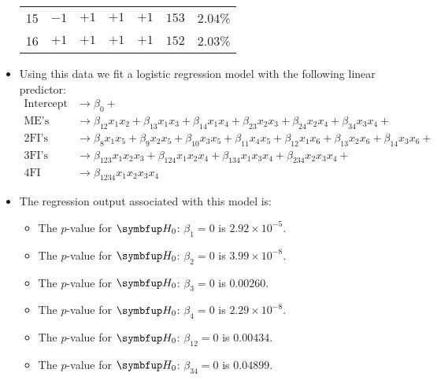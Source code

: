 \begin{itemize}
\begin{table}[!htbp]
\begin{tabular}{ccccccc}
                        15        & $-1$     & $+1$     & $+1$     & $+1$     & $153$    & $2.04$\%        \\
                        16        & $+1$     & $+1$     & $+1$     & $+1$     & $152$    & $2.03$\%        \\
                        \bottomrule
                  \end{tabular}
            \end{table}
      \item Using this data we fit a logistic regression model with the following linear predictor:
            \begin{align*}
                  \text{Intercept} & \to\beta_{0}+                                                                                                          \\
                  \text{ME's}      & \to\beta_{12}x_1x_2+\beta_{13}x_1x_3+\beta_{14}x_1x_4+\beta_{23}x_2x_3+\beta_{24}x_2x_4+\beta_{34}x_3x_4+              \\
                  \text{2FI's}     & \to\beta_{8}x_1x_5+\beta_9x_2x_5+\beta_{10}x_3x_5+\beta_{11}x_4x_5+\beta_{12}x_1x_6+\beta_{13}x_2x_6+\beta_{14}x_3x_6+ \\
                  \text{3FI's}     & \to\beta_{123}x_1x_2x_3+\beta_{124}x_1x_2x_4+\beta_{134}x_1x_3x_4+\beta_{234}x_2x_3x_4+                                \\
                  \text{4FI}       & \to\beta_{1234}x_1x_2x_3x_4
            \end{align*}
      \item The regression output associated with this model is:
            
            \begin{itemize}
                  \item The $ p $-value for $ \HN $: $ \beta_1=0 $ is $ 2.92\times 10^{-5} $.
                  \item The $ p $-value for $ \HN $: $ \beta_2=0 $ is $ 3.99\times 10^{-8} $.
                  \item The $ p $-value for $ \HN $: $ \beta_3=0 $ is $ 0.00260 $.
                  \item The $ p $-value for $ \HN $: $ \beta_4=0 $ is $ 2.29\times 10^{-8} $.
                  \item The $ p $-value for $ \HN $: $ \beta_{12}=0 $ is $ 0.00434 $.
                  \item The $ p $-value for $ \HN $: $ \beta_{34}=0 $ is $ 0.04899 $.

\end{itemize}
\end{itemize}
